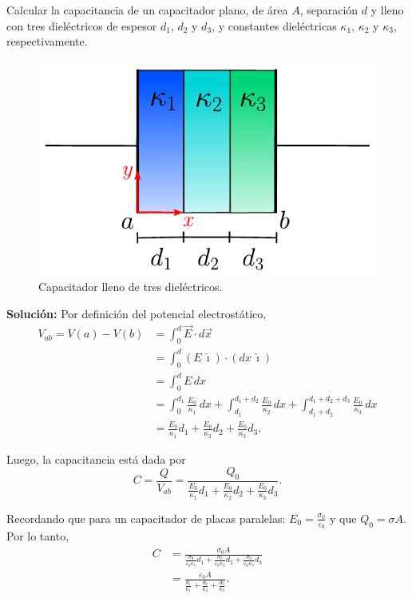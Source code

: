 \begin{ejemplo}
   Calcular la capacitancia de un capacitador plano, de área $A$, separación $d$ y lleno con tres dieléctricos de espesor $d_1$, $d_2$ y $d_3$, y constantes dieléctricas $\kappa_1$, $\kappa_2$ y $\kappa_3$, respectivamente.

\begin{figure}[H]
    \centering
    \includegraphics[scale = 0.7]{Figuras/Ej-Dielectrico.pdf}
    \caption{Capacitador lleno de tres dieléctricos.}
    \label{fig:Ej-Dielectrico}
\end{figure}

\textbf{Solución:} Por definición del potencial electrostático,
\begingroup
\allowdisplaybreaks
\begin{align*}
    V_{ab} = V(a) - V(b) &= \int_0^d \Vec{E} \cdot d\Vec{x} \\
    &= \int_0^d (E \,\hat{\imath}) \cdot (dx\, \hat{\imath}) \\
&= \int_0^d E \,dx \\
&= \int_0^{d_1} \frac{E_0}{\kappa_1} \,dx + \int_{d_1}^{d_1 + d_2} \frac{E_0}{\kappa_2} \,dx + \int_{d_1 + d_2}^{d_1  + d_2 + d_3} \frac{E_0}{\kappa_3} \,dx  \\
&= \frac{E_0}{\kappa_1} d_1 + \frac{E_0}{\kappa_2} d_2 + \frac{E_0}{\kappa_3} d_3.
\end{align*}
\endgroup

Luego, la capacitancia está dada por
$$C = \frac{Q}{V_{ab}} = \frac{Q_0}{\frac{E_0}{\kappa_1} d_1 + \frac{E_0}{\kappa_2} d_2 + \frac{E_0}{\kappa_3} d_3}.$$

Recordando que para un capacitador de placas paralelas: $E_0 = \frac{\sigma_0}{\varepsilon_0}$ y que $Q_0 = \sigma A$. Por lo tanto,
\begin{align*}
    C &= \frac{\sigma_0 A}{\frac{\sigma_0}{\varepsilon_0 \kappa_1} d_1 + \frac{\sigma_0}{\varepsilon_0 \kappa_2} d_2 + \frac{\sigma_0}{\varepsilon_0  \kappa_3} d_3} \\ 
    &= \frac{\varepsilon_0 A}{\frac{d_1}{\kappa_1} + \frac{d_2}{\kappa_2}  + \frac{d_3}{\kappa_3}}.
\end{align*}
  
\end{ejemplo}

